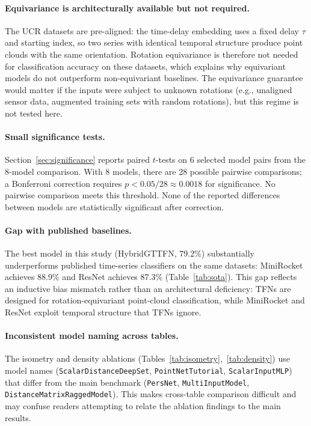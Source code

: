 \documentclass[a4paper,11pt]{article}
\begin{document}
\paragraph{Equivariance is architecturally available but not required.}
The UCR datasets are pre-aligned: the time-delay embedding uses a fixed delay $\tau$ and starting index, so two series with identical temporal structure produce point clouds with the same orientation.
Rotation equivariance is therefore not needed for classification accuracy on these datasets, which explains why equivariant models do not outperform non-equivariant baselines.
The equivariance guarantee would matter if the inputs were subject to unknown rotations (e.g., unaligned sensor data, augmented training sets with random rotations), but this regime is not tested here.

\paragraph{Small significance tests.}
Section~\ref{sec:significance} reports paired $t$-tests on 6 selected model pairs from the 8-model comparison.
With 8 models, there are 28 possible pairwise comparisons; a Bonferroni correction requires $p<0.05/28\approx0.0018$ for significance.
No pairwise comparison meets this threshold.
None of the reported differences between models are statistically significant after correction.

\paragraph{Gap with published baselines.}
The best model in this study (HybridGTTFN, 79.2\%) substantially underperforms published time-series classifiers on the same datasets: MiniRocket achieves 88.9\% and ResNet achieves 87.3\% (Table~\ref{tab:sota}).
This gap reflects an inductive bias mismatch rather than an architectural deficiency: TFNs are designed for rotation-equivariant point-cloud classification, while MiniRocket and ResNet exploit temporal structure that TFNs ignore.

\paragraph{Inconsistent model naming across tables.}
The isometry and density ablations (Tables~\ref{tab:isometry},~\ref{tab:density}) use model names (\texttt{ScalarDistanceDeepSet}, \texttt{PointNetTutorial}, \texttt{ScalarInputMLP}) that differ from the main benchmark (\texttt{PersNet}, \texttt{MultiInputModel}, \texttt{DistanceMatrixRaggedModel}).
This makes cross-table comparison difficult and may confuse readers attempting to relate the ablation findings to the main results.
\end{document}
